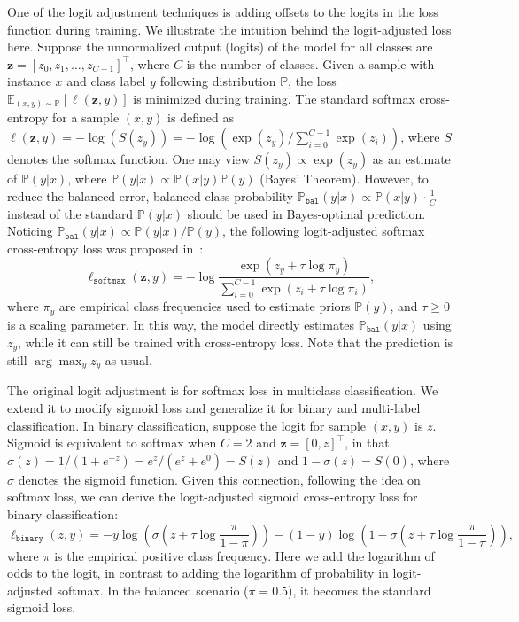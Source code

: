 \documentclass[runningheads]{llncs}
\begin{document}
One of the logit adjustment techniques is adding offsets to the logits in the loss function during training. We illustrate the intuition behind the logit-adjusted loss here. Suppose the unnormalized output (logits) of the model for all classes are $\mathbf{z}=[z_0,z_1,...,z_{C-1}]^\top$, where $C$ is the number of classes. Given a sample with instance $x$ and class label $y$ following distribution $\mathbb{P}$, the loss $\mathbb{E}_{(x,y)\sim\mathbb{P}}[\ell(\mathbf{z},y)]$ is minimized during training. The standard softmax cross-entropy for a sample $(x,y)$ is defined as $\ell(\mathbf{z}, y)=-\log(S(z_y))=-\log(\exp(z_y)/\sum_{i=0}^{C-1}\exp(z_i))$, where $S$ denotes the softmax function. One may view $S(z_y)\propto\exp(z_y)$ as an estimate of $\mathbb{P}(y|x)$, where $\mathbb{P}(y|x)\propto\mathbb{P}(x|y)\mathbb{P}(y)$ (Bayes' Theorem). However, to reduce the balanced error, balanced class-probability $\mathbb{P}_\mathtt{bal}(y|x)\propto\mathbb{P}(x|y)\cdot\frac{1}{C}$ instead of the standard $\mathbb{P}(y|x)$ should be used in Bayes-optimal prediction. Noticing $\mathbb{P}_\mathtt{bal}(y|x)\propto\mathbb{P}(y|x)/\mathbb{P}(y)$, the following logit-adjusted softmax cross-entropy loss was proposed in~\cite{menon2020long}:
\begin{equation}\label{eq4}
\ell_\mathtt{softmax}(\mathbf{z},y)=-\log\frac{\exp(z_y+\tau\log\pi_y)}{\sum_{i=0}^{C-1}\exp(z_i+\tau\log\pi_i)},
\end{equation}
where $\pi_y$ are empirical class frequencies used to estimate priors $\mathbb{P}(y)$, and $\tau\ge 0$ is a scaling parameter. In this way, the model directly estimates $\mathbb{P}_\mathtt{bal}(y|x)$ using $z_y$, while it can still be trained with cross-entropy loss. Note that the prediction is still $\arg\max_y z_y$ as usual.

The original logit adjustment is for softmax loss in multiclass classification. We extend it to modify sigmoid loss and generalize it for binary and multi-label classification. In binary classification, suppose the logit for sample $(x,y)$ is $z$. Sigmoid is equivalent to softmax when $C=2$ and $\mathbf{z}=[0, z]^\top$, in that $\sigma(z)=1/(1+e^{-z})=e^z/(e^z+e^0)=S(z)$ and $1-\sigma(z)=S(0)$, where $\sigma$ denotes the sigmoid function. Given this connection, following the idea on softmax loss, we can derive the logit-adjusted sigmoid cross-entropy loss for binary classification:
\begin{equation}
\ell_\mathtt{binary}(z,y)=-y\log(\sigma(z+\tau\log\frac{\pi}{1-\pi}))-(1-y)\log(1-\sigma(z+\tau\log\frac{\pi}{1-\pi})),
\end{equation}
where $\pi$ is the empirical positive class frequency. Here we add the logarithm of odds to the logit, in contrast to adding the logarithm of probability in logit-adjusted softmax. In the balanced scenario ($\pi=0.5$), it becomes the standard sigmoid loss.
\end{document}
